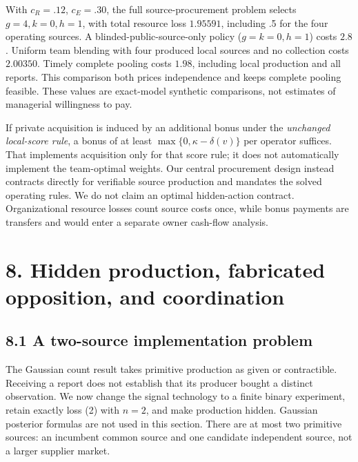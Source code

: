 \documentclass[
  11pt,
]{article}
\begin{document}
With \(c_R=.12\), \(c_E=.30\), the full source-procurement problem
selects \(g=4,k=0,h=1\), with total resource loss \(1.95591\), including
.5 for the four operating sources. A blinded-public-source-only policy
(\(g=k=0,h=1\)) costs \(2.8\). Uniform team blending with four produced
local sources and no collection costs \(2.00350\). Timely complete
pooling costs \(1.98\), including local production and all reports. This
comparison both prices independence and keeps complete pooling feasible.
These values are exact-model synthetic comparisons, not estimates of
managerial willingness to pay.

If private acquisition is induced by an additional bonus under the
\emph{unchanged local-score rule}, a bonus of at least
\(\max\{0,\kappa-\delta(v)\}\) per operator suffices. That implements
acquisition only for that score rule; it does not automatically
implement the team-optimal weights. Our central procurement design
instead contracts directly for verifiable source production and mandates
the solved operating rules. We do not claim an optimal hidden-action
contract. Organizational resource losses count source costs once, while
bonus payments are transfers and would enter a separate owner cash-flow
analysis.

\section{8. Hidden production, fabricated opposition, and
coordination}\label{hidden-production-fabricated-opposition-and-coordination}

\subsection{8.1 A two-source implementation
problem}\label{a-two-source-implementation-problem}

The Gaussian count result takes primitive production as given or
contractible. Receiving a report does not establish that its producer
bought a distinct observation. We now change the signal technology to a
finite binary experiment, retain exactly loss (2) with \(n=2\), and make
production hidden. Gaussian posterior formulas are not used in this
section. There are at most two primitive sources: an incumbent common
source and one candidate independent source, not a larger supplier
market.
\end{document}
